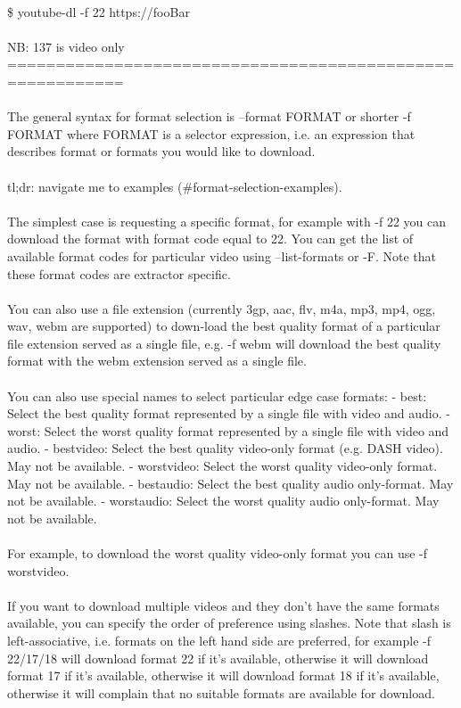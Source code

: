 \documentclass[10pt,a4paper]{article}
\begin{document}
{{{{{{{{{{{{{{{{\\
\$ youtube-dl -f 22 https://fooBar}{\large \\
\\
NB: 137 is video only\\
==========================================================\\
\\
The general syntax for format selection is --format FORMAT or shorter -f FORMAT where FORMAT is a selector expression, i.e.  an expression that describes format or formats you would like to download.\\
\\
tl;dr: navigate me to examples (\#format-selection-examples).\\
\\
The  simplest case is requesting a specific format, for example with -f 22 you can download the format with format code equal to 22.  You can get the list of available format codes for particular video using --list-formats or -F. Note that these format codes are extractor specific.\\
\\
You  can also use a file extension (currently 3gp, aac, flv, m4a, mp3, mp4, ogg, wav, webm are supported) to down‐load the best quality format of a particular file extension served as a single file, e.g.  -f webm  will  download the best quality format with the webm extension served as a single file.\\
\\
You can also use special names to select particular edge case formats: - best: Select the best quality format represented by a single file with video and audio.  - worst: Select the worst quality format represented by a  single file with video and audio.  - bestvideo: Select the best quality video-only format (e.g.  DASH video).  May not be available.  - worstvideo: Select the worst quality video-only format.  May not be available.  - bestaudio:  Select the best quality audio only-format.  May not be available.  - worstaudio: Select the worst quality audio only-format.  May not be available.\\
\\
For example, to download the worst quality video-only format you can use -f worstvideo.\\
\\
If you want to download multiple videos and they don't have the same formats available, you can specify the  order of  preference  using  slashes.  Note that slash is left-associative, i.e.  formats on the left hand side are preferred, for example -f 22/17/18 will download format 22 if it's available, otherwise it will download format 17 if it's  available,  otherwise it will download format 18 if it's available, otherwise it will complain that no suitable formats are available for download.\\
}}}}}}}}}}}}}}}}
\end{document}
